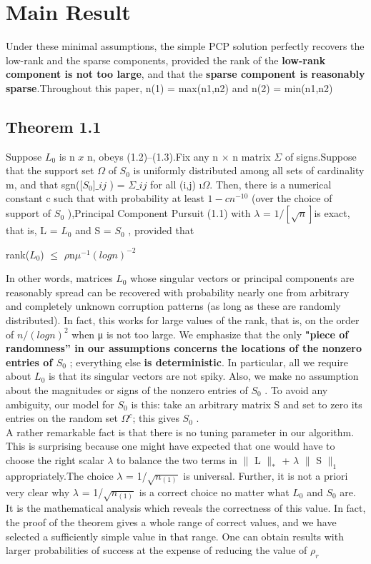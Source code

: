 \documentclass[letterpaper, 10 pt, conference]{ieeeconf}  %
\begin{document}
\section{Main Result}

Under these minimal assumptions, the simple PCP solution perfectly recovers the low-rank and the sparse components, provided the rank of the \textbf{low-rank component is not too large}, and that the \textbf{sparse component is reasonably sparse}.Throughout this paper,
	n(1) = max(n1,n2) and 
    n(2) = min(n1,n2)
    
\subsection{Theorem 1.1}
Suppose $L_0$ is n $x$ n, obeys (1.2)–(1.3).Fix any n $×$ n matrix $\Sigma$ of signs.Suppose that the support set $\Omega$ of $S_0$ is uniformly distributed among all sets of cardinality m, and that sgn([$S_0$]$\_ij$ ) = $\Sigma\_ij$ for all (i,j) \i $\Omega$. Then, there is a numerical constant c such that with probability at least $1−cn^{−10}$ (over the choice of support of $S_0$ ),Principal Component Pursuit (1.1) with $\lambda$ = $1/[\sqrt{n}]$is exact, that is, L = $L_0$ and S = $S_0$ ,
provided that
\begin{center}
rank($L_0$) $\leq$ $\rho$n$\mu^{-1}$$(logn)^{-2}$ 
\end{center}
In other words, matrices $L_0$ whose singular vectors or principal components are reasonably spread can be recovered with probability nearly one from arbitrary and completely unknown corruption patterns (as long as these are randomly distributed).
In fact, this works for large values of the rank, that is, on the order of $n/(logn)^{2}$ when μ is not too large. We emphasize that the only \textbf{"piece of randomness” in our assumptions concerns the locations of the nonzero entries of $S_0$} ; everything else \textbf{is deterministic}. In particular, all we require about $L_0$ is that its singular vectors are not spiky. Also, we make no assumption about the magnitudes or signs of the nonzero entries of $S_0$ . To avoid any ambiguity, our model for $S_0$ is this: take an arbitrary matrix S and set to zero its entries on the random set $\Omega^{c}$; this gives $S_0$ .
\\A rather remarkable fact is that there is no tuning parameter in our algorithm. This is surprising because one might have expected
that one would have to choose the right scalar $\lambda$ to balance the two terms in $\parallel$ L $\parallel_*$ + $\lambda$ $\parallel$ S $\parallel_1$ appropriately.The choice $
\lambda$ = 1/$\sqrt{n_(1)}$ is universal. Further, it is not a priori very clear why $\lambda$ = 1/$\sqrt{n_(1)}$ is a correct choice no matter what $L_0$ and $S_0$ are. It is the mathematical analysis which reveals the correctness of this value. In fact, the proof of the theorem gives a whole range of correct values, and we have selected a sufficiently simple value in that range.
One can obtain results with larger probabilities of success at the expense of reducing the value of $\rho_r$ 
\end{document}
